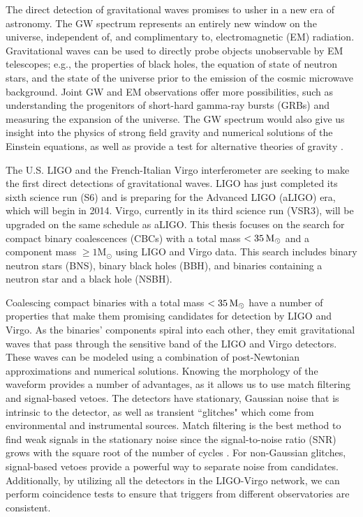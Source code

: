 The direct detection of gravitational waves promises to usher in a new era of astronomy. The \ac{GW} spectrum represents an entirely new window on the universe, independent of, and complimentary to, electromagnetic (EM) radiation. Gravitational waves can be used to directly probe objects unobservable by EM telescopes; e.g., the properties of black holes, the equation of state of neutron stars, and the state of the universe prior to the emission of the cosmic microwave background. Joint GW and EM observations offer more possibilities, such as understanding the progenitors of short-hard gamma-ray bursts (GRBs) and measuring the expansion of the universe. The GW spectrum would also give us insight into the physics of strong field gravity and numerical solutions of the Einstein equations, as well as provide a test for alternative theories of gravity \cite{SathyaSchutz}.

The U.S. \ac{LIGO} and the French-Italian Virgo interferometer are seeking to make the first direct detections of gravitational waves. \ac{LIGO} has just completed its sixth science run (S6) and is preparing for the Advanced LIGO (aLIGO) era, which will begin in 2014. Virgo, currently in its third science run (VSR3), will be upgraded on the same schedule as aLIGO. This thesis focuses on the search for compact binary coalescences (CBCs) with a total mass $< 35\,\mathrm{M_\odot}$ and a component mass $\mathrm{\geq 1M_\odot}$ using LIGO and Virgo data. This search includes binary neutron stars (BNS), binary black holes (BBH), and binaries containing a neutron star and a black hole (NSBH).

Coalescing compact binaries with a total mass $< 35\,\mathrm{M_\odot}$ have a number of properties that make them promising candidates for detection by LIGO and Virgo. As the binaries' components spiral into each other, they emit gravitational waves that pass through the sensitive band of the LIGO and Virgo detectors. These waves can be modeled using a combination of post-Newtonian approximations and numerical solutions. Knowing the morphology of the waveform provides a number of advantages, as it allows us to use match filtering and signal-based vetoes. The detectors have stationary, Gaussian noise that is intrinsic to the detector, as well as transient ``glitches" which come from environmental and instrumental sources. Match filtering is the best method to find weak signals in the stationary noise since the signal-to-noise ratio (SNR) grows with the square root of the number of cycles \cite{SathyaSchutz}. For non-Gaussian glitches, signal-based vetoes provide a powerful way to separate noise from candidates. Additionally, by utilizing all the detectors in the LIGO-Virgo network, we can perform coincidence tests to ensure that triggers from different observatories are consistent.

